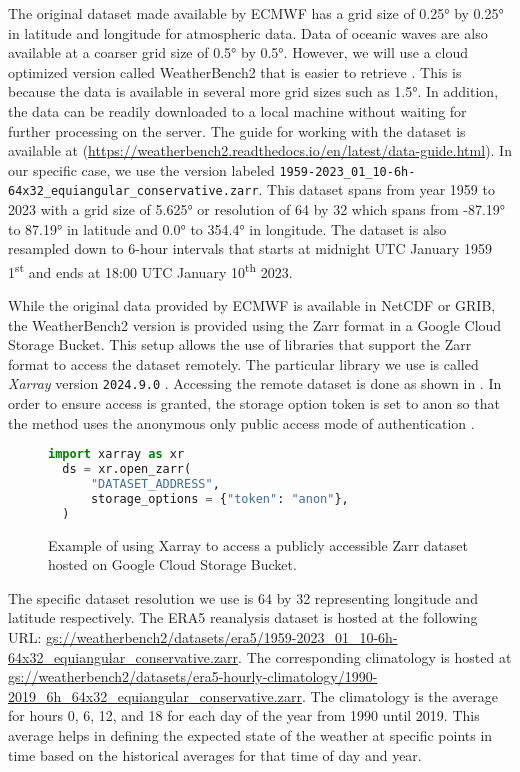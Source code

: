 The original dataset made available by ECMWF has a grid size of \ang{0.25} by \ang{0.25} in latitude and longitude for atmospheric data. Data of oceanic waves are also available at a coarser grid size of \ang{0.5} by \ang{0.5}. However, we will use a cloud optimized version called WeatherBench2 that is easier to retrieve \autocite{raspWeatherBench2Benchmark2023}. This is because the data is available in several more grid sizes such as \ang{1.5}. In addition, the data can be readily downloaded to a local machine without waiting for further processing on the server. The guide for working with the dataset is available at (\url{https://weatherbench2.readthedocs.io/en/latest/data-guide.html}). In our specific case, we use the version labeled \verb|1959-2023_01_10-6h-64x32_equiangular_conservative.zarr|. This dataset spans from year 1959 to 2023 with a grid size of \ang{5.625} or resolution of 64 by 32 which spans from \ang{-87.19} to \ang{87.19} in latitude and \ang{0.0} to \ang{354.4} in longitude. The dataset is also resampled down to 6-hour intervals that starts at midnight UTC January 1959 1\textsuperscript{st} and ends at 18:00 UTC January 10\textsuperscript{th} 2023.

While the original data provided by ECMWF is available in NetCDF or GRIB, the WeatherBench2 version is provided using the Zarr format in a Google Cloud Storage Bucket. This setup allows the use of libraries that support the Zarr format to access the dataset remotely. The particular library we use is called \emph{Xarray} version \verb|2024.9.0| \autocite{hoyer2017xarray,hoyerXarray2024}. Accessing the remote dataset is done as shown in . In order to ensure access is granted, the storage option token is set to anon so that the method uses the anonymous only public access mode of authentication \autocite{GCSFSGCSFs2023122post1+1g8e500c6dirty}.

\begin{figure}[H]
  \centering
  \begin{lstlisting}[language=Python]
  import xarray as xr
  ds = xr.open_zarr(
      "DATASET_ADDRESS",
      storage_options = {"token": "anon"},
  )
  \end{lstlisting}
  \caption{Example of using Xarray to access a publicly accessible Zarr dataset hosted on Google Cloud Storage Bucket.}\label{fig:access_remote_zarr}
\end{figure}
The specific dataset resolution we use is 64 by 32 representing longitude and latitude respectively. The ERA5 reanalysis dataset is hosted at the following URL\@: \url{gs://weatherbench2/datasets/era5/1959-2023_01_10-6h-64x32_equiangular_conservative.zarr}. The corresponding climatology is hosted at \url{gs://weatherbench2/datasets/era5-hourly-climatology/1990-2019_6h_64x32_equiangular_conservative.zarr}. The climatology is the average for hours 0, 6, 12, and 18 for each day of the year from 1990 until 2019. This average helps in defining the expected state of the weather at specific points in time based on the historical averages for that time of day and year.


